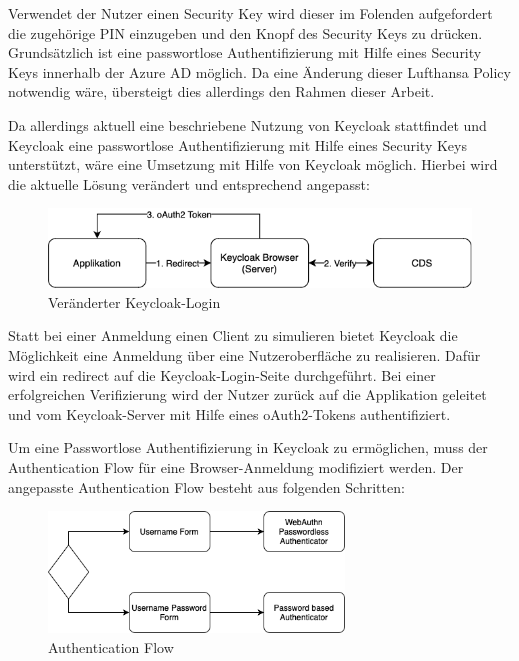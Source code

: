 Verwendet der Nutzer einen Security Key wird dieser im Folenden aufgefordert die zugehörige PIN einzugeben und den Knopf des Security Keys zu drücken. Grundsätzlich ist eine passwortlose Authentifizierung mit Hilfe eines Security Keys innerhalb der Azure \ac{AD} möglich. Da eine Änderung dieser Lufthansa Policy notwendig wäre, übersteigt dies allerdings den Rahmen dieser Arbeit.

Da allerdings aktuell eine beschriebene Nutzung von Keycloak stattfindet und Keycloak eine passwortlose Authentifizierung mit Hilfe eines Security Keys unterstützt, wäre eine Umsetzung mit Hilfe von Keycloak möglich. Hierbei wird die aktuelle Lösung verändert und entsprechend angepasst:

\begin{figure}[h]
	\centering 
	\includegraphics[width=1\textwidth]{img/abbildungen/keycloak_browser.png}
	\captionsetup{format=hang}
	\caption{Veränderter Keycloak-Login}
\end{figure}

Statt bei einer Anmeldung einen Client zu simulieren bietet Keycloak die Möglichkeit eine Anmeldung über eine Nutzeroberfläche zu realisieren. Dafür wird ein redirect auf die Keycloak-Login-Seite durchgeführt. Bei einer erfolgreichen Verifizierung wird der Nutzer zurück auf die Applikation geleitet und vom Keycloak-Server mit Hilfe eines oAuth2-Tokens authentifiziert. 

Um eine Passwortlose Authentifizierung in Keycloak zu ermöglichen, muss der Authentication Flow für eine Browser-Anmeldung modifiziert werden. Der angepasste Authentication Flow besteht aus folgenden Schritten:

\begin{figure}[h]
	\centering 
	\includegraphics[width=0.7\textwidth]{img/abbildungen/authentication_flow.png}
	\captionsetup{format=hang}
	\caption{Authentication Flow}
\end{figure}

